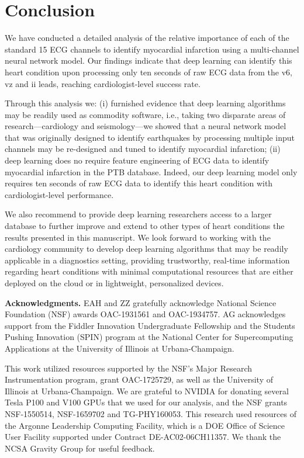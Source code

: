 \documentclass{svproc}
\begin{document}
\section{Conclusion} 

We have conducted a detailed analysis of the relative importance of each of the standard 15 ECG channels to identify myocardial infarction using a multi-channel neural network model. Our findings indicate that deep learning can identify this heart condition upon processing only ten seconds of raw ECG data from the v6, vz and ii leads, reaching cardiologist-level success rate.

Through this analysis we: (i) furnished evidence that deep learning algorithms may be readily used as commodity software, i.e., taking two disparate areas of research---cardiology and seismology---we showed that a neural network model that was originally designed to identify earthquakes by processing multiple input channels may be re-designed and tuned to identify myocardial infarction; (ii) deep learning does no require feature engineering of ECG data to identify myocardial infarction in the PTB database. Indeed, our deep learning model only requires ten seconds of raw ECG data to identify this heart condition with cardiologist-level performance.

We also recommend to provide deep learning researchers access to a larger database to further improve and extend  to other types of heart conditions the results presented in this manuscript.  We look forward to working with the cardiology community to develop deep learning algorithms that may be readily applicable in a diagnostics setting, providing trustworthy, real-time information regarding heart conditions with minimal computational resources that are either deployed on the cloud or in lightweight, personalized devices. 

\vspace{3mm}

\textbf{Acknowledgments.} EAH and ZZ gratefully acknowledge National Science Foundation (NSF) awards OAC-1931561 and OAC-1934757. AG acknowledges support from the Fiddler Innovation Undergraduate Fellowship and the Students Pushing Innovation (SPIN) program at the National Center for Supercomputing Applications at the University of Illinois at Urbana-Champaign.

This work utilized resources supported by the NSF's Major Research Instrumentation program, grant OAC-1725729, as well as the University of Illinois at Urbana-Champaign. We are grateful to NVIDIA for donating several Tesla P100 and V100 GPUs that we used for our analysis, and the NSF grants NSF-1550514, NSF-1659702 and TG-PHY160053. This research used resources of the Argonne Leadership Computing Facility, which is a DOE Office of Science User Facility supported under Contract DE-AC02-06CH11357. We thank the NCSA Gravity Group for useful feedback. 


















\printbibliography
\end{document}
